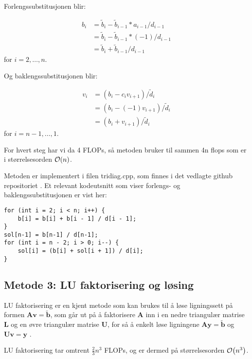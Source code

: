 \documentclass[reprint,english,notitlepage]{revtex4-1}
\begin{document}
	Forlengssubstitusjonen blir:
	
	\begin{equation*}
	\begin{aligned}
	b_i &= \tilde{b}_i - \tilde{b}_{i-1} * a_{i-1}/d_{i-1} \\
	&= \tilde{b}_i - \tilde{b}_{i-1} * (-1)/d_{i-1} \\
	&= \tilde{b}_i + \tilde{b}_{i-1} /d_{i-1}
	\end{aligned}
	\end{equation*}
	for $i=2,\dots, n$.
	
	Og baklengssubstitusjonen blir:
	
	\begin{equation*}
	\begin{aligned}
	v_{i} &= (b_{i} - c_{i}v_{i+1}) / \tilde{d}_{i} \\
	&= (b_{i} - (-1)v_{i+1}) / \tilde{d}_{i} \\
	&= (b_{i} + v_{i+1}) / \tilde{d}_{i}
	\end{aligned}
	\end{equation*}
	for $i=n-1,\dots, 1$.
	
	For hvert steg har vi da 4 FLOPs, så metoden bruker til sammen 4n flops som er i størrelsesorden $\order{n}$.
	
	Metoden er implementert i filen tridiag.cpp, som finnes i det vedlagte github repositoriet \cite{myRepo}. Et relevant kodeutsnitt som viser forlengs- og baklengssubstitusjonen er vist her:
	
	\begin{verbatim}
for (int i = 2; i < n; i++) {
    b[i] = b[i] + b[i - 1] / d[i - 1];
}
sol[n-1] = b[n-1] / d[n-1];
for (int i = n - 2; i > 0; i--) {
    sol[i] = (b[i] + sol[i + 1]) / d[i];
}
	\end{verbatim}
	
	
\subsection{Metode 3: LU faktorisering og løsing}
	LU faktorisering er en kjent metode som kan brukes til å løse ligningssett på formen $\mathbf{A}\mathbf{v} = \tilde{\mathbf{b}}$, som går ut på å faktorisere $\mathbf{A}$ inn i en nedre triangulær matrise $\mathbf{L}$ og en øvre triangulær matrise $\mathbf{U}$, for så å enkelt løse ligningene $\mathbf{A}\mathbf{y} = \tilde{\mathbf{b}}$ og $\mathbf{U}\mathbf{v} = \mathbf{y}$ \cite{luwiki}.
	
	LU faktorisering tar omtrent $\frac{2}{3}n^3$ FLOPs, og er dermed på størrelsesorden $\order{n^3}$.
	
\end{document}

